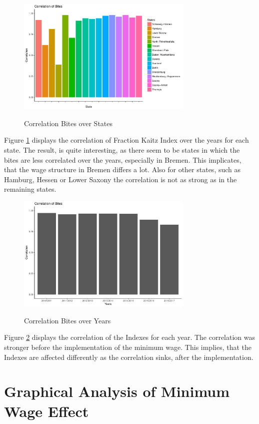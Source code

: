 \documentclass[a4paper]{article}
\begin{document}
{\begin{figure}[h]
\caption{Correlation Bites over States}
\centering
\includegraphics[width=0.75\textwidth]{q5/outputcorrelationbitesstates.pdf}
\label{q5cor1}
\end{figure}
Figure \ref{q5cor1} displays the correlation of Fraction Kaitz Index over the years for each state. The result, is quite interesting, as there seem to be states in which the bites are less correlated over the years, especially in Bremen. This implicates, that the wage structure in Bremen differs a lot. Also for other states, such as Hamburg, Hessen or Lower Saxony the correlation is not as strong as in the remaining states. \newline
\begin{figure}[h]
\caption{Correlation Bites over Years}
\centering
\includegraphics[width=0.75\textwidth]{q5/outputcorrelationbitesyearly.pdf}
\label{q5cor2}
\end{figure}
Figure \ref{q5cor2} displays the correlation of the Indexes for each year. The correlation was stronger before the implementation of the minimum wage. This implies, that the Indexes are affected differently as the correlation sinks, after the implementation.
%
\newpage
\section{Graphical Analysis of Minimum Wage Effect}
}
\end{document}
